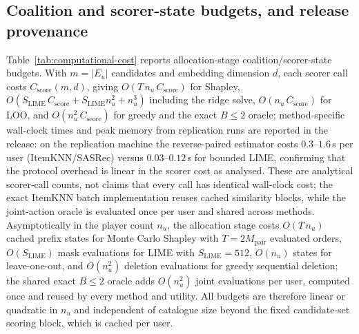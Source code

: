 \documentclass[pdflatex,sn-mathphys-num]{sn-jnl}
\theoremstyle{thmstyleone}
\theoremstyle{thmstyletwo}
\theoremstyle{thmstylethree}
\begin{document}
\subsection{Coalition and scorer-state budgets, and release provenance}
Table~\ref{tab:computational-cost} reports allocation-stage coalition/scorer-state budgets. With $m=|E_u|$ candidates and embedding dimension $d$, each scorer call costs $C_{\mathrm{score}}(m,d)$, giving $O(T\,n_u\,C_{\mathrm{score}})$ for Shapley, $O(S_{\mathrm{LIME}}\,C_{\mathrm{score}}+S_{\mathrm{LIME}}n_u^2+n_u^3)$ including the ridge solve, $O(n_u\,C_{\mathrm{score}})$ for LOO, and $O(n_u^2\,C_{\mathrm{score}})$ for greedy and the exact $B\le2$ oracle; method-specific wall-clock times and peak memory from replication runs are reported in the release: on the replication machine the reverse-paired estimator costs $0.3$--$1.6$\,s per user (ItemKNN/SASRec) versus $0.03$--$0.12$\,s for bounded LIME, confirming that the protocol overhead is linear in the scorer cost as analysed. These are analytical scorer-call counts, not claims that every call has identical wall-clock cost; the exact ItemKNN batch implementation reuses cached similarity blocks, while the joint-action oracle is evaluated once per user and shared across methods. Asymptotically in the player count $n_u$, the allocation stage costs $O(T\,n_u)$ cached prefix states for Monte Carlo Shapley with $T=2M_{\mathrm{pair}}$ evaluated orders, $O(S_{\mathrm{LIME}})$ mask evaluations for LIME with $S_{\mathrm{LIME}}=512$, $O(n_u)$ states for leave-one-out, and $O(n_u^2)$ deletion evaluations for greedy sequential deletion; the shared exact $B\le2$ oracle adds $O(n_u^2)$ joint evaluations per user, computed once and reused by every method and utility. All budgets are therefore linear or quadratic in $n_u$ and independent of catalogue size beyond the fixed candidate-set scoring block, which is cached per user.
\end{document}

